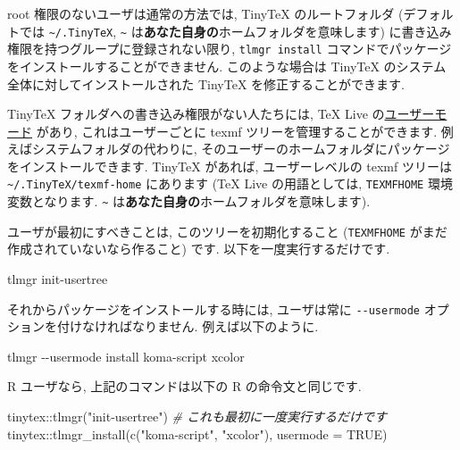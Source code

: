 \documentclass[
  xelatex,ja=standard,jafont=noto]{bxjsreport}
\newenvironment{Shaded}{\begin{snugshade}}{\end{snugshade}}
\newcommand{\AttributeTok}[1]{\textcolor[rgb]{0.77,0.63,0.00}{#1}}
\newcommand{\CommentTok}[1]{\textcolor[rgb]{0.56,0.35,0.01}{\textit{#1}}}
\newcommand{\ConstantTok}[1]{\textcolor[rgb]{0.00,0.00,0.00}{#1}}
\newcommand{\ExtensionTok}[1]{#1}
\newcommand{\FunctionTok}[1]{\textcolor[rgb]{0.00,0.00,0.00}{#1}}
\newcommand{\NormalTok}[1]{#1}
\newcommand{\SpecialCharTok}[1]{\textcolor[rgb]{0.00,0.00,0.00}{#1}}
\newcommand{\StringTok}[1]{\textcolor[rgb]{0.31,0.60,0.02}{#1}}
\begin{document}
root 権限のないユーザは通常の方法では, TinyTeX のルートフォルダ
(デフォルトでは \texttt{\textasciitilde{}/.TinyTeX},
\texttt{\textasciitilde{}}
は\textbf{あなた自身の}ホームフォルダを意味します)
に書き込み権限を持つグループに登録されない限り, \texttt{tlmgr\ install}
コマンドでパッケージをインストールすることができません. このような場合は
TinyTeX のシステム全体に対してインストールされた TinyTeX
を修正することができます.

TinyTeX フォルダへの書き込み権限がない人たちには, TeX Live
の\href{https://www.tug.org/texlive/doc/tlmgr.html\#USER-MODE}{ユーザーモード}
があり, これはユーザーごとに texmf ツリーを管理することができます.
例えばシステムフォルダの代わりに,
そのユーザーのホームフォルダにパッケージをインストールできます. TinyTeX
があれば, ユーザーレベルの texmf ツリーは
\texttt{\textasciitilde{}/.TinyTeX/texmf-home} にあります (TeX Live
の用語としては, \texttt{TEXMFHOME} 環境変数となります.
\texttt{\textasciitilde{}}
は\textbf{あなた自身の}ホームフォルダを意味します).

ユーザが最初にすべきことは, このツリーを初期化すること
(\texttt{TEXMFHOME} がまだ作成されていないなら作ること) です.
以下を一度実行するだけです.

\begin{Shaded}
\begin{Highlighting}[]
\ExtensionTok{tlmgr}\NormalTok{ init{-}usertree}
\end{Highlighting}
\end{Shaded}

それからパッケージをインストールする時には, ユーザは常に
\texttt{-\/-usermode} オプションを付けなければなりません.
例えば以下のように.

\begin{Shaded}
\begin{Highlighting}[]
\ExtensionTok{tlmgr} \AttributeTok{{-}{-}usermode}\NormalTok{ install koma{-}script xcolor}
\end{Highlighting}
\end{Shaded}

R ユーザなら, 上記のコマンドは以下の R の命令文と同じです.

\begin{Shaded}
\begin{Highlighting}[numbers=left,,]
\NormalTok{tinytex}\SpecialCharTok{::}\FunctionTok{tlmgr}\NormalTok{(}\StringTok{"init{-}usertree"}\NormalTok{) }\CommentTok{\# これも最初に一度実行するだけです}
\NormalTok{tinytex}\SpecialCharTok{::}\FunctionTok{tlmgr\_install}\NormalTok{(}\FunctionTok{c}\NormalTok{(}\StringTok{"koma{-}script"}\NormalTok{, }\StringTok{"xcolor"}\NormalTok{), }\AttributeTok{usermode =} \ConstantTok{TRUE}\NormalTok{)}
\end{Highlighting}
\end{Shaded}
\end{document}
